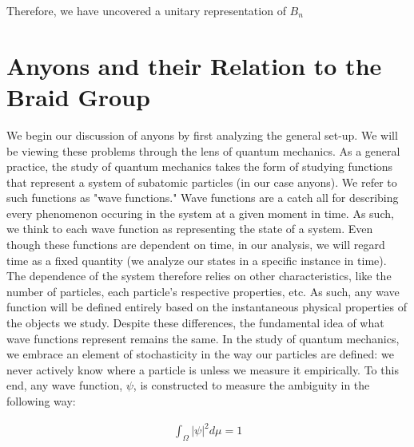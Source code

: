 Therefore, we have uncovered a unitary representation of $B_n$

\section{Anyons and their Relation to the Braid Group}

We begin our discussion of anyons by first analyzing the general set-up. We will be viewing these problems through the lens of quantum mechanics. As a general practice, the study of quantum mechanics takes the form of studying functions that represent a system of subatomic particles (in our case anyons). We refer to such functions as "wave functions." Wave functions are a catch all for describing every phenomenon occuring in the system at a given moment in time. As such, we think to each wave function as representing the state of a system. Even though these functions are dependent on time, in our analysis, we will regard time as a fixed quantity (we analyze our states in a specific instance in time). The dependence of the system therefore relies on other characteristics, like the number of particles, each particle's respective properties, etc. As such, any wave function will be defined entirely based on the instantaneous physical properties of the objects we study. Despite these differences, the fundamental idea of what wave functions represent remains the same. In the study of quantum mechanics, we embrace an element of stochasticity in the way our particles are defined: we never actively know where a particle is unless we measure it empirically. To this end, any wave function, $\psi$, is constructed to measure the ambiguity in the following way:

\begin{equation}
	\begin{aligned}
		\int_\Omega |\psi|^2 d\mu = 1
	\end{aligned}
\end{equation}

